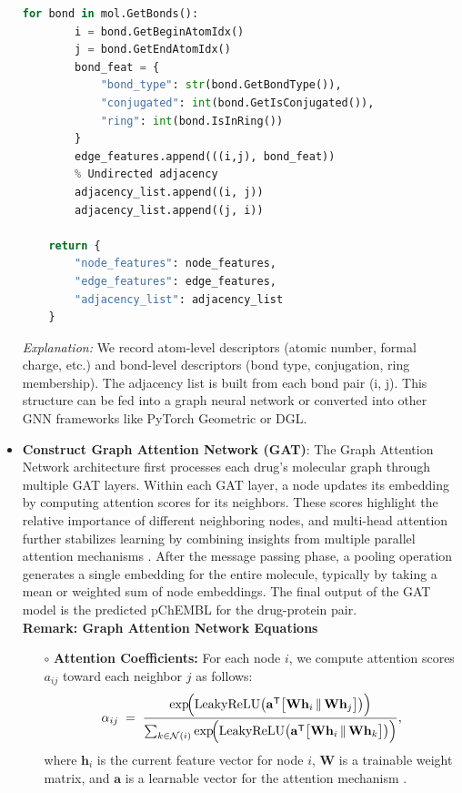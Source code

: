 \documentclass[fontsize=11pt]{article}
\begin{document}
\begin{itemize}
\begin{lstlisting}[language=Python]
    for bond in mol.GetBonds():
        i = bond.GetBeginAtomIdx()
        j = bond.GetEndAtomIdx()
        bond_feat = {
            "bond_type": str(bond.GetBondType()),
            "conjugated": int(bond.GetIsConjugated()),
            "ring": int(bond.IsInRing())
        }
        edge_features.append(((i,j), bond_feat))
        % Undirected adjacency
        adjacency_list.append((i, j))
        adjacency_list.append((j, i))

    return {
        "node_features": node_features,
        "edge_features": edge_features,
        "adjacency_list": adjacency_list
    }
\end{lstlisting}

\noindent
\emph{Explanation:} We record atom-level descriptors (atomic number, formal charge, etc.) and 
bond-level descriptors (bond type, conjugation, ring membership). The adjacency list is built
from each bond pair (i, j). This structure can be fed into a graph neural network or converted 
into other GNN frameworks like PyTorch Geometric or DGL.

\item \textbf{Construct Graph Attention Network (GAT)}: The Graph Attention Network architecture first processes each drug’s molecular graph through multiple GAT layers. Within each GAT layer, a node updates its embedding by computing attention scores for its neighbors. These scores highlight the relative importance of different neighboring nodes, and multi-head attention further stabilizes learning by combining insights from multiple parallel attention mechanisms \cite{Velickovic2018}. After the message passing phase, a pooling operation generates a single embedding for the entire molecule, typically by taking a mean or weighted sum of node embeddings. The final output of the GAT model is the predicted pChEMBL for the drug-protein pair. \\
    
    \small \textbf{Remark: Graph Attention Network Equations}

    \begin{itemize}
            \item[$\circ$] \textbf{Attention Coefficients:} For each node $i$, we compute attention scores $a_{ij}$ toward each neighbor $j$ as follows:
            \[
                \alpha_{ij} \;=\;
                \frac{\exp\!\Bigl(\mathrm{LeakyReLU}\bigl(\mathbf{a}^\mathsf{T}
                    \bigl[\mathbf{W}\mathbf{h}_i \,\|\, \mathbf{W}\mathbf{h}_j\bigr]\bigr)\Bigr)}
                     {\sum_{k \in \mathcal{N}(i)} \exp\!\Bigl(\mathrm{LeakyReLU}\bigl(\mathbf{a}^\mathsf{T}
                       \bigl[\mathbf{W}\mathbf{h}_i \,\|\, \mathbf{W}\mathbf{h}_k\bigr]\bigr)\Bigr)},
            \]
            where $\mathbf{h}_i$ is the current feature vector for node $i$, $\mathbf{W}$ is a trainable weight matrix, and $\mathbf{a}$ is a learnable vector for the attention mechanism \cite{Velickovic2018}.


\end{itemize}
\end{itemize}
\end{document}
